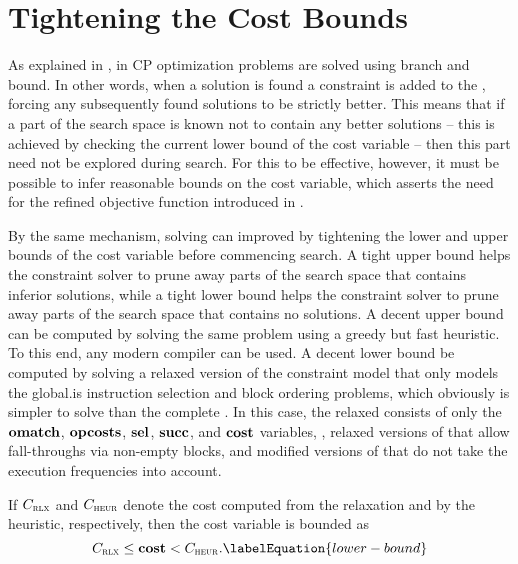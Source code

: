 \section{Tightening the Cost Bounds}

As explained in , in \gls{CP} optimization
problems are solved using \gls{branch and bound}.
%
In other words, when a \gls{solution} is found a \gls{constraint} is added to
the , forcing any subsequently found \glspl{solution}
to be strictly better.
%
This means that if a part of the \gls{search space} is known not to contain any
better \glspl{solution} -- this is achieved by checking the current lower bound
of the \gls{cost variable} -- then this part need not be explored during
\gls{search}.
%
For this to be effective, however, it must be possible to infer reasonable
bounds on the \gls{cost variable}, which asserts the need for the refined
\gls{objective function} introduced in
.

By the same mechanism, solving can improved by tightening the lower and upper
bounds of the \gls{cost variable} before commencing \gls{search}.
%
A tight upper bound helps the \gls{constraint solver} to prune away parts of the
\gls{search space} that contains inferior \glspl{solution}, while a tight lower
bound helps the \gls{constraint solver} to prune away parts of the \gls{search
  space} that contains no \glspl{solution}.
%
A decent upper bound can be computed by solving the same problem using a greedy
but fast heuristic.
%
To this end, any modern \gls{compiler} can be used.
%
A decent lower bound be computed by solving a relaxed version of the
\gls{constraint model} that only models the \gls{global.is} \gls{instruction
  selection} and \gls{block ordering} problems, which obviously is simpler to
solve than the complete .
%
In this case, the relaxed  consists of only the
$\mVar{omatch}$, $\mVar{opcosts}$, $\mVar{sel}$, $\mVar{succ}$, and
$\mVar{cost}$ variables, , relaxed versions of
 that allow fall-throughs via
non-empty \glspl{block}, and modified versions of
 that
do not take the execution frequencies into account.

If $C_{\textsc{\textrm{rlx}}}$ and $C_{\textsc{\textrm{heur}}}$ denote the cost computed from the
relaxation and by the heuristic, respectively, then the \gls{cost variable} is
bounded as
%
\begin{equation}
  \mRelaxedCost \leq \mVar{cost} < \mHeuristicCost.
  \labelEquation{lower-bound}
\end{equation}


